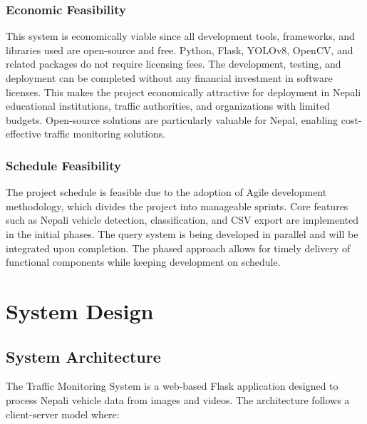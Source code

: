 \documentclass[12pt,a4paper]{report}
\begin{document}
\subsection{Economic Feasibility}
This system is economically viable since all development tools, frameworks, and libraries used are open-source and free. Python, Flask, YOLOv8, OpenCV, and related packages do not require licensing fees. The development, testing, and deployment can be completed without any financial investment in software licenses. This makes the project economically attractive for deployment in Nepali educational institutions, traffic authorities, and organizations with limited budgets. Open-source solutions are particularly valuable for Nepal, enabling cost-effective traffic monitoring solutions.

\subsection{Schedule Feasibility}
The project schedule is feasible due to the adoption of Agile development methodology, which divides the project into manageable sprints. Core features such as Nepali vehicle detection, classification, and CSV export are implemented in the initial phases. The query system is being developed in parallel and will be integrated upon completion. The phased approach allows for timely delivery of functional components while keeping development on schedule.



\usepackage{float} %
\chapter{System Design}

\section{System Architecture}
The Traffic Monitoring System is a web-based Flask application designed to process Nepali vehicle data from images and videos. The architecture follows a client-server model where:
\end{document}
